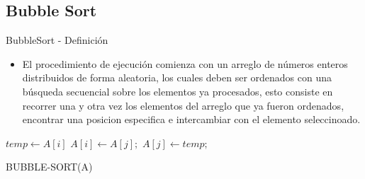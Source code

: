 \documentclass[11pt]{beamer}
\begin{document}
		\subsection{Bubble Sort}
		\begin{frame}{BubbleSort - Definición}
		    \begin{itemize}
		         \item El procedimiento de ejecución comienza con un arreglo de números enteros distribuidos de forma aleatoria, los cuales deben ser ordenados con una búsqueda secuencial sobre los elementos ya procesados, esto consiste en recorrer una y otra vez los elementos del arreglo que ya fueron ordenados, encontrar una posicion especifica e intercambiar con el elemento seleccinoado.
		    \end{itemize}
		    \begin{algorithm}[H]
                \begin{algorithmic}[1]
                                \STATE $temp \gets A[i]$
                                \STATE $A[i] \gets A[j];$ 
                                \STATE $A[j] \gets temp;$
                            \ENDIF    
                        \ENDFOR
                    \ENDFOR
                \end{algorithmic}
                \caption{BUBBLE-SORT(A)}
                \label{alg:bubble-sort}
            \end{algorithm}
		\end{frame}
\end{document}
